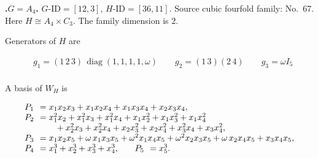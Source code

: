 \documentclass[12pt]{amsart}
\makeatletter
\numberwithin{equation}{section}
\theoremstyle{plain}
\theoremstyle{definition}
\theoremstyle{remark}
\DeclareMathOperator{\diag}{diag}
\newcommand{\PBasisLabel}[1]{\mathrlap{P_{#1}}\phantom{P_{99}}}
\newenvironment{SecEightAlignedBasis}[1]{%
  \begingroup\renewcommand{\arraystretch}{1.18}%
  \[\begin{array}{@{}#1@{}}%
}{\end{array}\]\endgroup}
\newenvironment{familydisplay}{%
  \begingroup
  \setlength{\arraycolsep}{1.35pt}%
  \renewcommand{\arraystretch}{0.96}%
  \setlength{\jot}{2pt}%
}{\endgroup}
\makeatother
\begin{document}
\par{}\medskip\noindent\textbf{.\enspace $G=A_4$.}\label{fam:threefold-no-16}
$G\text{-ID}=[12,3]$, $H\text{-ID}=[36,11]$.
Source cubic fourfold family: No.~67.  Here
$H\cong A_4\times C_3$.
The family dimension is $2$.
\par\smallskip\noindent Generators of $H$ are\par\nopagebreak
\begin{familydisplay}
\begin{align*}
&g_{1}=(1\,2\,3)\,\diag(1,1,1,1,\omega)\qquad g_{2}=(1\,3)(2\,4)\qquad g_{3}=\omega I_5\\
\end{align*}
\end{familydisplay}
\par\smallskip\noindent A basis of $W_H$ is\par\nopagebreak
\begin{familydisplay}
\begin{SecEightAlignedBasis}{l@{\qquad}l}
\multicolumn{2}{@{}l@{}}{\PBasisLabel{1}=x_{1}x_{2}x_{3}+x_{1}x_{2}x_{4}+x_{1}x_{3}x_{4}+x_{2}x_{3}x_{4},}\\
\multicolumn{2}{@{}l@{}}{\PBasisLabel{2}=x_{1}^{2}x_{2}+x_{1}^{2}x_{3}+x_{1}^{2}x_{4}+x_{1}x_{2}^{2}+x_{1}x_{3}^{2}+x_{1}x_{4}^{2}}\\
\multicolumn{2}{@{}l@{}}{\hphantom{\PBasisLabel{1}=}\quad +x_{2}^{2}x_{3}+x_{2}^{2}x_{4}+x_{2}x_{3}^{2}+x_{2}x_{4}^{2}+x_{3}^{2}x_{4}+x_{3}x_{4}^{2},}\\
\multicolumn{2}{@{}l@{}}{\PBasisLabel{3}=x_{1}x_{2}x_{5}+\omega\,x_{1}x_{3}x_{5}+\omega^2x_{1}x_{4}x_{5}+\omega^2x_{2}x_{3}x_{5}+\omega\,x_{2}x_{4}x_{5}+x_{3}x_{4}x_{5},}\\
\PBasisLabel{4}=x_{1}^{3}+x_{2}^{3}+x_{3}^{3}+x_{4}^{3}, & \PBasisLabel{5}=x_{5}^{3}.
\end{SecEightAlignedBasis}
\end{familydisplay}
\end{document}
